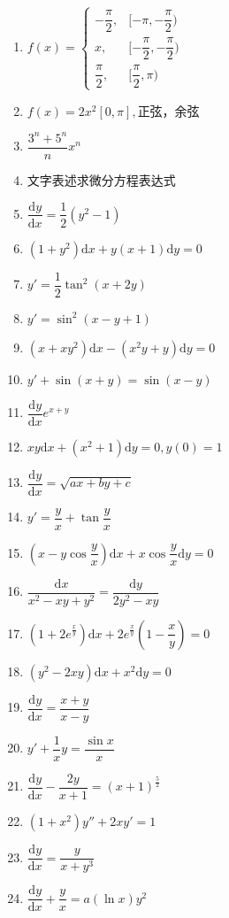 \documentclass[UTF8,a4paper,12pt,scheme=chinese]{ctexart}
\newcommand{\ud}{\mathrm{d}}
\begin{document}
\begin{Large}
\begin{enumerate}
			\item 	$ f(x)=\left\lbrace \begin{array}{ll}-\dfrac{\pi}{2},&[-\pi,-\dfrac{\pi}{2})\\x,&[-\dfrac{\pi}{2},-\dfrac{\pi}{2})\\\dfrac{\pi}{2},&[\dfrac{\pi}{2},\pi)\end{array} \right. $
			\item 	$ f(x)=2x^2[0,\pi], $正弦，余弦
			\item 	$ \dfrac{3^n+5^n}{n}x^n $
			\item 	文字表述求微分方程表达式
			\item 	$ \dfrac{\ud y}{\ud x}=\dfrac{1}{2}(y^2-1) $
			\item 	$ (1+y^2)\ud x + y(x+1) \ud y =0 $
			\item 	$ y'=\dfrac{1}{2}\tan^2(x+2y) $
			\item 	$ y'=\sin^2(x-y+1) $
			\item 	$ (x+xy^2)\ud x - (x^2y + y)\ud y =0 $
			\item 	$ y'+\sin(x+y)=\sin(x-y) $
			\item 	$ \dfrac{\ud y}{\ud x}e^{x+y} $
			\item 	$ xy\ud x +(x^2+1)\ud y=0,y(0)=1 $
			\item 	$ \dfrac{\ud y}{\ud x}=\sqrt{ax+by+c} $
			\item 	$ y'=\dfrac{y}{x}+\tan\dfrac{y}{x} $
			\item 	$ (x-y\cos\dfrac{y}{x})\ud x+x\cos\dfrac{y}{x}\ud y =0 $
			\item 	$ \dfrac{\ud x}{x^2-xy+y^2}=\dfrac{\ud y}{2y^2-xy} $
			\item 	$ (1+2e^{\frac{x}{y}})\ud x+2e^{\frac{x}{y}}(1-\dfrac{x}{y})=0 $
			\item 	$ (y^2-2xy)\ud x + x^2\ud y=0 $
			\item 	$ \dfrac{\ud y}{\ud x}=\dfrac{x+y}{x-y} $
			\item 	$ y'+\dfrac{1}{x}y=\dfrac{\sin x}{x} $
			\item 	$ \dfrac{\ud y}{\ud x}-\dfrac{2y}{x+1}=(x+1)^{\frac{5}{2}} $
			\item 	$ (1+x^2)y''+2xy'=1 $
			\item 	$ \dfrac{\ud y}{\ud x}=\dfrac{y}{x+y^3} $
			\item 	$ \dfrac{\ud y}{\ud x}+\dfrac{y}{x}=a(\ln x)y^2 $
		\end{enumerate}
	\end{Large}
\end{document}
